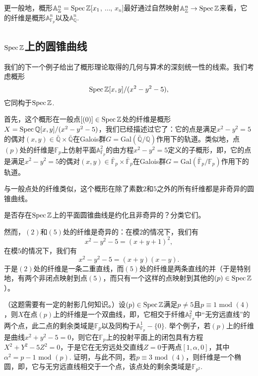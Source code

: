 更一般地，概形$\mathbb{A}_{\mathbb{Z}}^n=\operatorname{Spec} \mathbb{Z}[x_1$, $\dots$, $x_n]$最好通过自然映射$\mathbb{A}_{\mathbb{Z}}^n\to\operatorname{Spec} \mathbb{Z}$来看，它的纤维是概形$\mathbb{A}_{\mathbb{F}_p}^n$以及$\mathbb{A}_{\mathbb{Q}}^n$.

\subsection{$\operatorname{Spec} \mathbb{Z}$上的圆锥曲线}\label{sec:2.4.4}

我们的下一个例子给出了概形理论取得的几何与算术的深刻统一性的线索。我们考虑概形
\[
	\operatorname{Spec} \mathbb{Z}[x,y]/(x^2-y^2-5),
\]
它同构于$\operatorname{Spec} \mathbb{Z}$.

首先，这个概形在一般点$[(0)]\in \operatorname{Spec} \mathbb{Z}$处的纤维是概形$X=\operatorname{Spec} \mathbb{Q}[x,y]/(x^2-y^2-5)$，我们已经描述过它了：它的点是满足$x^2-y^2=5$的偶对$(x,y)\in \bar{\mathbb{Q}}\times \bar{\mathbb{Q}}$在Galois群$G=\mathrm{Gal}(\bar{\mathbb{Q}}/\mathbb{Q})$作用下的轨道。类似地，点$(p)$处的纤维是$\mathbb{F}_p$上仿射平面$\mathbb{A}_{\mathbb{F}_p}^2$的由方程$x^2-y^2=5$定义的子概形，即，它的点是满足$x^2-y^2=5$的偶对$(x,y)\in \bar{\mathbb{F}}_p\times \bar{\mathbb{F}}_p$在Galois群$G=\mathrm{Gal}(\bar{\mathbb{F}}_p/\mathbb{F}_p)$作用下的轨道。

与一般点处的纤维类似，这个概形在除了素数$2$和$5$之外的所有纤维都是非奇异的圆锥曲线。

\begin{exe}
	是否存在$\operatorname{Spec} \mathbb{Z}$上的平面圆锥曲线是约化且非奇异的？分类它们。
\end{exe}

然而，$(2)$和$(5)$处的纤维是奇异的：在模$2$的情况下，我们有
\[
	x^2-y^2-5=(x+y+1)^2,
\]
在模$5$的情况下，我们有
\[
	x^2-y^2-5=(x+y)(x-y).
\]
于是$(2)$处的纤维是一条二重直线，而$(5)$处的纤维是两条直线的并（于是特别地，有两个非闭点映射到点$(5)$，而只有一个这样的点映射到其他的$(p)\in \operatorname{Spec} \mathbb{Z}$）。


\begin{exe}
	（这题需要有一定的射影几何知识。）设$(p)\in\operatorname{Spec}\mathbb{Z}$满足$p\neq 5$且$p\equiv 1\text{ mod } (4)$，则$X$在点$(p)$上的纤维是一个双曲线，即，它相交于纤维$\mathbb{A}_{\mathbb{F}_p}^2$中“无穷远直线”的两个点，此二点的剩余类域是$\mathbb{F}_p$以及同构于$\mathbb{A}_{\mathbb{F}_p}^1-\{0\}$. 举个例子，若$(p)$上的纤维是曲线$x^2+y^2-5=0$，则它在$\mathbb{F}_p$上的投射平面上的闭包具有方程$X^2+Y^2-5Z^2=0$，于是它在无穷远处交直线$Z=0$于两点$[1,\alpha,0]$，其中$\alpha^2=p-1\text{ mod } (p)$. 证明，与此不同，若$p\equiv 3\text{ mod } (4)$，则纤维是一个椭圆，即，它与无穷远直线相交于一个点，该点处的剩余类域是$\mathbb{F}_{p^2}$.
\end{exe}

